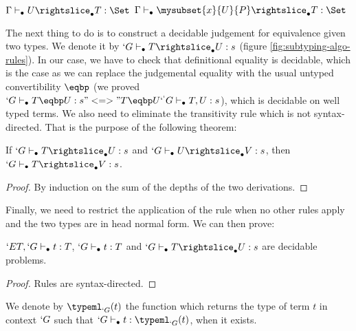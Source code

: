 \documentclass{llncs}
\def\figureshrink{0em}
\renewcommand{\SubSubAs}[1][\Gamma]{%
\UAX{SubSub}
{$\subalgoimpl{#1}{c}{U}{T}{\Set}$}
{$\subalgoimpl{#1}{c[\eltpit~\ctxdot]}{\mysubset{x}{U}{P}}{T}{\Set}$}
{}
}
\begin{document}
\begin{paragraph}{}

\begin{figure*}
    \def\fCenter{\suba}
    \def\type{\typea}
    \def\sub{\suba}
    \begin{center}
    \SubConvA\DP 

    \vspace{\infvspace}
    \SubHnfA\DP

    \vspace{\infvspace}
    \SubProdA\DP

    \vspace{\infvspace}
    \SubSigmaA\DP

    \vspace{\infvspace}
    \SubProofA\DP

    \vspace{\infvspace}
    \SubSubAs\DP
  \end{center}
  \vspace{\figureshrink}
  \caption{\Russell{} algorithmic equivalence}
  \label{fig:subtyping-algo-rules}
  \vspace{\figureshrink}
\end{figure*}


\end{paragraph}
\begin{paragraph}{}
  The next thing to do is to construct a decidable judgement for
  equivalence given two types. We denote it by $`G \typea T
  \suba U : s$ (figure \ref{fig:subtyping-algo-rules}).
  In our case, we have to check that definitional equality is decidable, which is the
  case as we can replace the judgemental equality with the usual untyped
  convertibility $\eqbp$ (we proved $`G \type T \eqbp U : s
  "<=>" T \eqbp U `^ `G \type T, U : s$), which is decidable on well
  typed terms.
  We also need to eliminate the transitivity rule which is not
  syntax-directed. That is the purpose of the following theorem:
\begin{theorem}
  If $`G \typea T \suba U : s$ and $`G \typea U \suba V : s$, then $`G \typea T
  \suba V : s$.
\end{theorem}
\begin{proof}
  By induction on the sum of the depths of the two derivations.
\end{proof}

  Finally, we need to restrict the application of the 
  rule when no other rules apply and the two types are in head normal form.
  We can then prove:
  \begin{theorem}
    $`E T, `G \vdash_{\bullet} t : T$, $`G \vdash_{\bullet} t : T$ and $`G \typea T \suba U :
    s$ are decidable problems.
  \end{theorem}
  \begin{proof}
    Rules are syntax-directed.
  \end{proof}

  We denote by $\typeafn{`G}{t}$ the function which returns the type of
  term $t$ in context $`G$ such that $`G \typea t : \typeafn{`G}{t}$,
  when it exists.
\end{paragraph}
\end{document}
